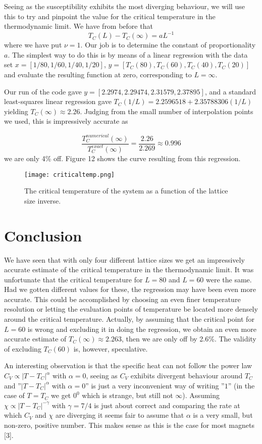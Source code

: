 \documentclass[english, 12pt]{article}
\newcommand{\f}{\frac}
\begin{document}
Seeing as the susceptibility exhibits the most diverging behaviour, we will use this to try and pinpoint the value for the critical temperature in the thermodynamic limit. We have from before that
$$T_C(L)-T_C(\infty) = aL^{-1}$$ where we have put $\nu=1$. Our job is to determine the constant of proportionality $a$. The simplest way to do this is by means of a linear regression with the data set  $x = [1/80, 1/60, 1/40, 1/20]$, $y=[T_C(80), T_C(60), T_C(40), T_C(20)]$ and evaluate the resulting function at zero, corresponding to $L=\infty$.

Our run of the code gave $y = [2.2974, 2.29474, 2.31579, 2.37895]$, and a standard least-squares linear regression gave
$T_C(1/L) = 2.2596518 + 2.35788306(1/L)$ yielding $T_C(\infty) \approx 2.26$. Judging from the small number of interpolation points we used, this is impressively accurate as

$$\f{T_C^{numerical}(\infty)}{T_C^{exact}(\infty)} = \f{2.26}{2.269} \approx 0.996$$
we are only 4\% off. Figure 12 shows the curve resulting from this regression.


\begin{figure}[hbt!]
\centering
\texttt{[image: criticaltemp.png]}
\caption{The critical temperature of the system as a function of the lattice size inverse.}
\end{figure}


\section{Conclusion}
We have seen that with only four different lattice sizes we get an impressively accurate estimate of the critical temperature in the thermodynamic limit. It was unfortunate that the critical temperature for $L=80$ and $L=60$ were the same. Had we gotten different values for these, the regression may have been even more accurate. This could be accomplished by choosing an even finer temperature resolution or letting the evaluation points of temperature be located more densely around the critical temperature. Actually, by assuming that the critical point for $L=60$ is wrong and excluding it in doing the regression, we obtain an even more accurate estimate of $T_C(\infty) \approx 2.263$, then we are only off by 2.6\%. The validity of excluding $T_C(60)$ is, however, speculative.

An interesting observation is that the specific heat can not follow the power law $C_V \propto |T-T_C|^\alpha$ with $\alpha = 0$, seeing as $C_V$ exhibits divergent behaviour around $T_C$ and ''$|T-T_C|^\alpha$ with $\alpha=0$'' is just a very inconvenient way of writing ''$1$'' (in the case of $T=T_C$ we get $0^0$ which is strange, but still not $\infty$). Assuming $\chi\propto |T-T_C|^{-\gamma} $ with $\gamma = 7/4$ is just about correct and comparing the rate at which $C_V$ and $\chi$ are diverging it seems fair to assume that $\alpha$ is a very small, but non-zero, positive number. This makes sense as this is the case for most magnets [3].
\end{document}
